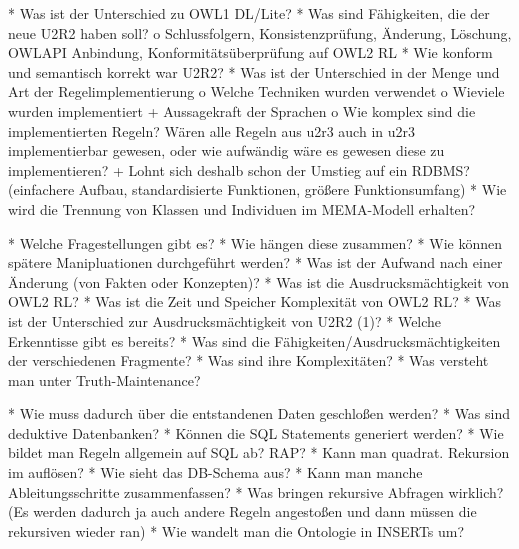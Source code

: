     * Was ist der Unterschied zu OWL1 DL/Lite?
    * Was sind Fähigkeiten, die der neue U2R2 haben soll?
          o Schlussfolgern, Konsistenzprüfung, Änderung, Löschung, OWLAPI Anbindung, Konformitätsüberprüfung auf OWL2 RL 
    * Wie konform und semantisch korrekt war U2R2?
    * Was ist der Unterschied in der Menge und Art der Regelimplementierung
          o Welche Techniken wurden verwendet
          o Wieviele wurden implementiert
                + Aussagekraft der Sprachen 
          o Wie komplex sind die implementierten Regeln? Wären alle Regeln aus u2r3 auch in u2r3 implementierbar gewesen, oder wie aufwändig wäre es gewesen diese zu implementieren?
                + Lohnt sich deshalb schon der Umstieg auf ein RDBMS? (einfachere Aufbau, standardisierte Funktionen, größere Funktionsumfang) 
    * Wie wird die Trennung von Klassen und Individuen im MEMA-Modell erhalten?
    
    
        * Welche Fragestellungen gibt es?
    * Wie hängen diese zusammen?
    * Wie können spätere Manipluationen durchgeführt werden?
    * Was ist der Aufwand nach einer Änderung (von Fakten oder Konzepten)?
    * Was ist die Ausdrucksmächtigkeit von OWL2 RL?
    * Was ist die Zeit und Speicher Komplexität von OWL2 RL?
    * Was ist der Unterschied zur Ausdrucksmächtigkeit von U2R2 (1)?
    * Welche Erkenntisse gibt es bereits?
    * Was sind die Fähigkeiten/Ausdrucksmächtigkeiten der verschiedenen Fragmente?
    * Was sind ihre Komplexitäten?
    * Was versteht man unter Truth-Maintenance? 


    * Wie muss dadurch über die entstandenen Daten geschloßen werden?
    * Was sind deduktive Datenbanken?
    * Können die SQL Statements generiert werden?
    * Wie bildet man Regeln allgemein auf SQL ab? RAP?
    * Kann man quadrat. Rekursion im auflösen?
    * Wie sieht das DB-Schema aus?
    * Kann man manche Ableitungsschritte zusammenfassen?
    * Was bringen rekursive Abfragen wirklich? (Es werden dadurch ja auch andere Regeln angestoßen und dann müssen die rekursiven wieder ran)
    * Wie wandelt man die Ontologie in INSERTs um? 
    
     